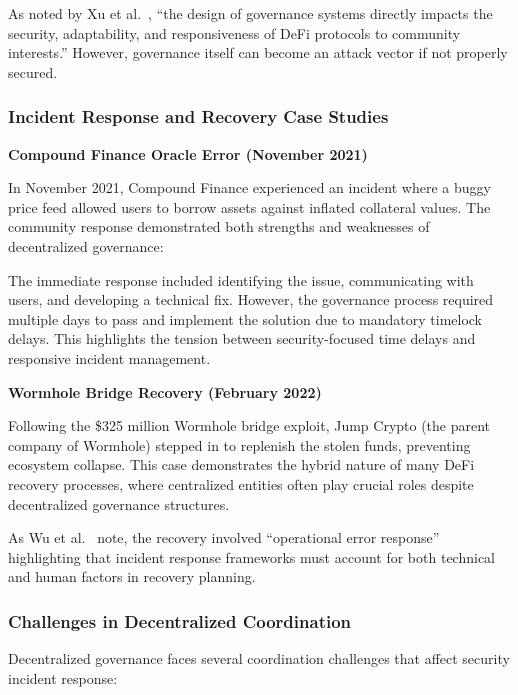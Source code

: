 \documentclass[conference]{IEEEtran}
\begin{document}
    As noted by Xu et al.~\cite{xu2021sok}, ``the design of governance systems directly impacts the security, adaptability, and responsiveness of DeFi protocols to community interests.'' However, governance itself can become an attack vector if not properly secured.

    \subsubsection{Incident Response and Recovery Case Studies}
    \textbf{Compound Finance Oracle Error (November 2021)}

    In November 2021, Compound Finance experienced an incident where a buggy price feed allowed users to borrow assets against inflated collateral values. The community response demonstrated both strengths and weaknesses of decentralized governance:

    The immediate response included identifying the issue, communicating with users, and developing a technical fix. However, the governance process required multiple days to pass and implement the solution due to mandatory timelock delays. This highlights the tension between security-focused time delays and responsive incident management.

    \textbf{Wormhole Bridge Recovery (February 2022)}

    Following the \$325 million Wormhole bridge exploit, Jump Crypto (the parent company of Wormhole) stepped in to replenish the stolen funds, preventing ecosystem collapse. This case demonstrates the hybrid nature of many DeFi recovery processes, where centralized entities often play crucial roles despite decentralized governance structures.

    As Wu et al.~\cite{wu2025exploring} note, the recovery involved ``operational error response'' highlighting that incident response frameworks must account for both technical and human factors in recovery planning.

    \subsubsection{Challenges in Decentralized Coordination}
    Decentralized governance faces several coordination challenges that affect security incident response:
\end{document}
